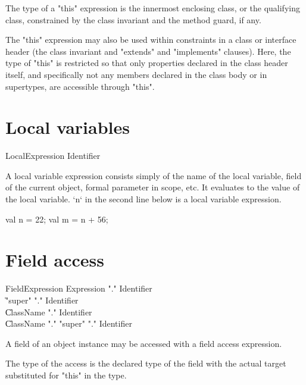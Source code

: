 The type of a \xcd"this" expression is the
innermost enclosing class, or the qualifying class,
constrained by the class invariant and the
method guard, if any.

The \xcd"this" expression may also be used within constraints in
a class or interface header (the class invariant and
\xcd"extends" and \xcd"implements" clauses).  Here, the type of
\xcd"this" is restricted so that only properties declared in the
class header itself, and specifically not any members declared in the class
body or in supertypes, are accessible through \xcd"this".

\section{Local variables}

\begin{grammar}
LocalExpression \: Identifier \\
\end{grammar}

A local variable expression consists simply of the name of the local variable,
field of the current object, formal parameter in scope, etc. It evaluates to
the value of the local variable. \xcd`n` in the second line below is a local
variable expression. 
\begin{xten}
val n = 22;
val m = n + 56;
\end{xten}



\section{Field access}
\label{FieldAccess}


\begin{grammar}
FieldExpression \: Expression \xcd"." Identifier \\
                \| \xcd"super" \xcd"." Identifier \\
                \| ClassName \xcd"." Identifier \\
                \| ClassName \xcd"." \xcd"super" \xcd"." Identifier \\
\end{grammar}

A field of an object instance may be  accessed
with a field access expression.

The type of the access is the declared type of the field with the
actual target substituted for \xcd"this" in the type. 

